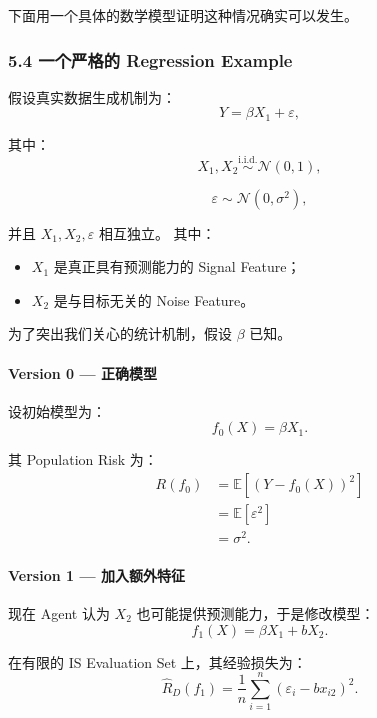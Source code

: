 下面用一个具体的数学模型证明这种情况确实可以发生。

\hypertarget{part-1-07-0001-ux4e00ux4e2aux4e25ux683cux7684-regression-example}{%
\subsubsection{5.4 一个严格的 Regression Example}\label{part-1-07-0001-ux4e00ux4e2aux4e25ux683cux7684-regression-example}}

假设真实数据生成机制为：
\[Y=\beta X_1+\varepsilon,\]

其中：
\[X_1,X_2\overset{\mathrm{i.i.d.}}{\sim}
\mathcal N(0,1),\]

\[\varepsilon\sim\mathcal N(0,\sigma^2),\]

并且 \(X_1,X_2,\varepsilon\) 相互独立。 其中：

\begin{itemize}
\tightlist
\item
  \(X_1\) 是真正具有预测能力的 Signal Feature；
\item
  \(X_2\) 是与目标无关的 Noise Feature。
\end{itemize}

为了突出我们关心的统计机制，假设 \(\beta\) 已知。

\hypertarget{part-1-07-0001-version-0-ux6b63ux786eux6a21ux578b}{%
\paragraph{Version 0 --- 正确模型}\label{part-1-07-0001-version-0-ux6b63ux786eux6a21ux578b}}

设初始模型为：
\[f_0(X)=\beta X_1.\]

其 Population Risk 为：
\[\begin{aligned}
R(f_0)
&=\mathbb E[(Y-f_0(X))^2]\\
&=\mathbb E[\varepsilon^2]\\
&=\sigma^2.
\end{aligned}\]

\hypertarget{part-1-07-0001-version-1-ux52a0ux5165ux989dux5916ux7279ux5f81}{%
\paragraph{Version 1 --- 加入额外特征}\label{part-1-07-0001-version-1-ux52a0ux5165ux989dux5916ux7279ux5f81}}

现在 Agent 认为 \(X_2\) 也可能提供预测能力，于是修改模型：
\[f_1(X)=\beta X_1+bX_2.\]

在有限的 IS Evaluation Set 上，其经验损失为：
\[\widehat R_D(f_1)
=
\frac1n
\sum_{i=1}^{n}
(\varepsilon_i-bx_{i2})^2.\]

